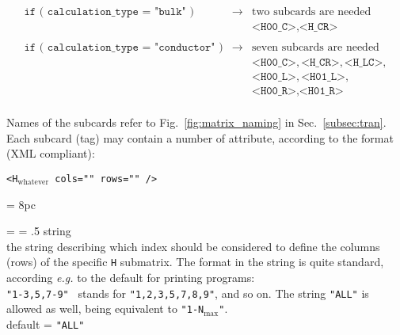 %
%
\begin{displaymath}
\begin{array}{lll}
\texttt{if ( calculation\_type = "bulk" )}         & \rightarrow &
                                                     \textrm{two subcards are needed}\\
\texttt{}                                          & \texttt{}   &
                                                     \texttt{<H00\_C>},\texttt{<H\_CR>}\\
\texttt{}                                          & \texttt{}   & \textbf{}\\
\texttt{if ( calculation\_type = "conductor" )}    & \rightarrow &
                                                     \textrm{seven subcards are needed}\\

\texttt{}                                          & \texttt{}   &
                                                     \texttt{<H00\_C>},
                                                     \texttt{<H\_CR>},\texttt{<H\_LC>},\\
\texttt{}                                          & \texttt{}   &
                                                     \texttt{<H00\_L>},\texttt{<H01\_L>},\\
\texttt{}                                          & \texttt{}   &
                                                     \texttt{<H00\_R>}, \texttt{<H01\_R>}\\
\end{array}
\end{displaymath}
%
%

\noindent Names of the subcards refer to Fig.~\ref{fig:matrix_naming} in
Sec.~\ref{subsec:tran}.
Each subcard (tag) may contain a number of attribute, according to the
format (XML compliant):
%
%
\begin{description}
\item
   {\tt <H$_{\text{whatever}}$  cols=""  rows=""  />}
\end{description}
%
%


\newdimen\descindent \descindent = 8pc
{\noindent \leftskip = \descindent \parskip = .5\baselineskip
{}%
{\sc string} \\
the string describing which index should be considered to define the
columns (rows) of the specific {\tt H} submatrix.
The format in the string is quite standard, according {\it e.g.} to the default
for printing programs: \\
{\tt  "1-3,5,7-9" } stands for {\tt "1,2,3,5,7,8,9"}, and so on.
The string {\tt "ALL"} is allowed as well, being equivalent to
{\tt "1-N$_{\text{max}}$"}. \\
{\sc default} = {\tt "ALL"} \par

}

